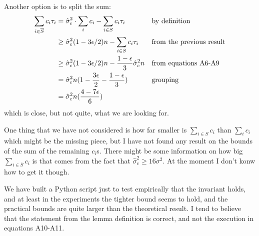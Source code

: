 \documentclass[11pt]{article}
\begin{document}
Another option is to split the sum:
\begin{align*}
\sum_{i \in \overline S} c_i \tau_i &= \hat\sigma_c^2 \cdot \sum_i c_i - \sum_{i \in S} c_i \tau_i &&\text{by definition}\\
&\ge \hat\sigma_c^2(1-3\epsilon/2)n - \sum_{i\in S}c_i \tau_i&&\text{from the previous result}\\
&\ge \hat\sigma_c^2(1-3\epsilon/2)n - {1-\epsilon \over 3}\hat\sigma_c^2n &&\text{from equations A6-A9}\\
&= \hat\sigma_c^2n(1-{3\epsilon\over 2} - {1-\epsilon \over 3}) &&\text{grouping}\\
&= \hat\sigma_c^2n({4-7\epsilon \over 6})
\end{align*}
which is close, but not quite, what we are looking for.

One thing that we have not considered is how far smaller is \(\sum_{i\in S} c_i\) than \(\sum_i c_i\) which might be the missing piece, but I have not found any result on the bounds of the sum of the remaining \(c_i\)s.
There might be some information on how big \(\sum_{i \in \overline S} c_i\) is that comes from the fact that \(\hat\sigma_c^2 \ge 16 \sigma^2\).
At the moment I don't konw how to get it though.

We have built a Python script just to test empirically that the invariant holds, and at least in the experiments the tighter bound seems to hold, and the practical bounds are quite larger than the theoretical result. I tend to believe that the statement from the lemma definition is correct, and not the execution in equations A10-A11.
\end{document}
